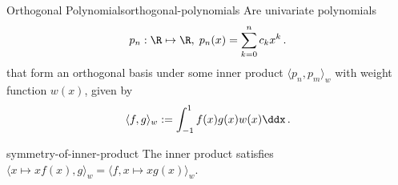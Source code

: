 \begin{definition}{Orthogonal Polynomials}{orthogonal-polynomials}
  Are univariate polynomials
  $$p_n: \R \mapsto \R, \; p_n(x) = \sum_{k=0}^{n} c_k x^k\,.$$
  that form an orthogonal basis under some inner product $\langle p_n, p_m \rangle_w$ with weight function $w(x)$, given by
  $$\langle f, g \rangle_w := \int_{-1}^{1} f(x) g(x) w(x) \ddx\,.$$
\end{definition}

\begin{remark}{}{symmetry-of-inner-product}
  The inner product satisfies $\langle x\mapsto xf(x), g \rangle_w = \langle f, x \mapsto xg(x)\rangle_w$.
\end{remark}
